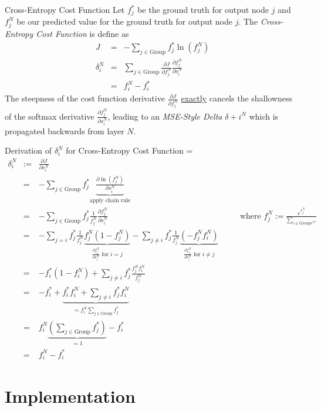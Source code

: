 \documentclass[11pt,a4paper]{article}
\begin{document}
\begin{definition}{Cross-Entropy Cost Function}
  Let $f^*_j$ be the ground truth for output node $j$ and $f_j^N$ be our predicted value for the ground truth for output node $j$. The \textit{Cross-Entropy Cost Function} is define as
  \[\begin{array}{rrl}
  J&=&-\displaystyle\sum_{j\in\text{Group}}f_j^*\ln(f_j^N)\\
  \delta_i^N&=&\displaystyle\sum_{j\in\text{Group}}\frac{\partial J}{\partial f_j^N}\frac{\partial f_j^N}{\partial s_i^N}\\
  &=&f_i^N-f_i^*
  \end{array}\]
  The steepness of the cost function derivative $\frac{\partial J}{\partial f_j^N}$ \underline{exactly} cancels the shallowness of the softmax derivative $\frac{\partial f_j^N}{\partial s_i^N}$, leading to an \textit{MSE-Style Delta} $\delta+i^N$ which is propagated backwards from layer $N$.
\end{definition}

\begin{proposition}{Derivation of $\delta_i^N$ for Cross-Entropy Cost Function}
  \everymath={\displaystyle}
  \[\begin{array}{rrlcl}
    \delta_i^N&:=&\frac{\partial J}{\partial s_i^N}&\quad&\\
    &=&-\sum_{j\in\text{Group}}f_j^*\underbrace{\frac{\partial \ln(f_j^N)}{\partial s_i^N}}_\text{apply chain rule}\\
    &=&-\sum_{j\in\text{Group}}f_j^*\frac1{f_j^N}\frac{\partial f_j^N}{\partial s_i^N}&&\text{where }f_j^N:=\frac{e^{s_j^N}}{\sum_{i\in\text{Group}e^{s_i^N}}}\\
    &=&-\sum_{j=i}f_j^*\frac1{f_j^N}\underbrace{f_j^N(1-f_j^N)}_{\frac{\partial f_j^N}{\partial s_i^N}\text{ for }i=j}-\sum_{j\neq i}f_j^*\frac1{f_j^N}\underbrace{(-f_j^Nf_i^N)}_{\frac{\partial f_j^N}{\partial s_i^N}\text{ for }i\neq j}\\
    &=&-f_i^*(1-f_i^N)+\sum_{j\neq i}f_j^*\frac{f_j^Nf_i^N}{f_j^N}\\
    &=&-f_i^*+\underbrace{f_i^*f_i^N+\sum_{j\neq i}f_j^*f_i^N}_{=f_i^N\sum_{j\in\text{Group}}f_j^*}\\
    &=&f_i^N\underbrace{\left(\sum_{j\in\text{Group}}f_j^*\right)}_{=1}-f_i^*\\
    &=&f_i^N-f_i^*
  \end{array}\]
\end{proposition}

\section{Implementation}
\end{document}
